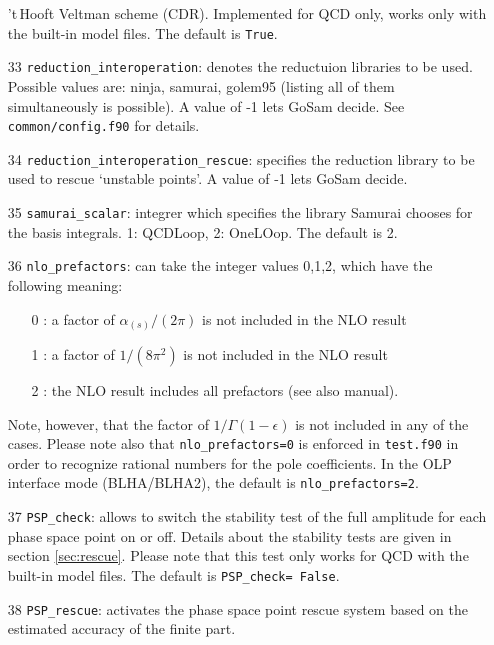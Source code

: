 \documentclass[11pt,a4paper]{refrep}
\newcommand{\gosam}{{\sc GoSam}\xspace}
\newcommand{\samurai}{{\sc Samurai}\xspace}
\newcommand{\tHV}{{'t\,Hooft Veltman}}
\begin{document}
\begin{enumerate}
 \tHV{} scheme (CDR).                      
Implemented for QCD only, works only with the built-in model files.    The default is  {\tt True}.
\item[33] \texttt{reduction\_interoperation}: denotes the reductuion libraries to be used. 
  Possible values are: ninja, samurai, golem95 (listing all of them simultaneously is possible). 
  A value of -1 lets \gosam{} decide.
  See {\tt common/config.f90} for details.                              
\item[34] \texttt{reduction\_interoperation\_rescue}: specifies the reduction library to be used to rescue `unstable points'. A value of -1 lets \gosam{} decide.
\item[35] \texttt{samurai\_scalar}: integrer which specifies the library \samurai{} 
chooses for the basis integrals. 1: {\sc QCDLoop}, 2: {\sc OneLOop}. The default is 2. 
\item[36] \texttt{nlo\_prefactors}:  can take the integer values 0,1,2, which have the        
    following meaning:    
    \begin{enumerate}                                          
    \item[0]: a factor of $\alpha_{(s)}/(2\pi)$ is not included in the NLO result
    \item[1]: a factor of $1/(8\pi^2)$ is not included in the NLO result       
    \item[2]: the NLO result includes all prefactors   (see also manual).
    \end{enumerate}                           
    Note, however, that the factor of $1/\Gamma(1-\epsilon)$ is not         
    included in any of the cases.                                   
    Please note also that {\tt nlo\_prefactors=0} is enforced in {\tt test.f90}
    in order to recognize rational numbers for the 
    pole coefficients. In the OLP interface mode (BLHA/BLHA2), the default is
    {\tt nlo\_prefactors=2}.                                 
\item[37] \texttt{PSP\_check}: allows to switch the stability test of the full amplitude for 
each phase space point on or off.
Details about the stability tests are given in section \ref{sec:rescue}.
Please note that this test only works for QCD  with the built-in model files.
The default is \texttt{PSP\_check= False}. 
\item[38] \texttt{PSP\_rescue}:  
    activates the phase space point rescue system based on the estimated       
    accuracy of the finite part.                                    

\end{enumerate}
\end{document}
